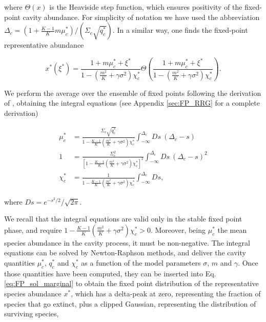 \documentclass[
    preprint,
    linenumbers,
    amsmath,amssymb,amsfonts,
    aps, physrev,
    superscriptaddress,
    10pt,
    bibnotes
    ]{revtex4-2}
\begin{document}
where $\Theta(x)$ is the Heaviside step function, which ensures positivity
of the fixed-point cavity abundance. For simplicity of notation we
have used the abbreviation $\Delta_{c}=(1+\frac{K-1}{K}m\mu_{c}^{*})/(\Sigma_{c}\sqrt{q_{c}^{*}})$. In a similar way, one finds the
fixed-point representative abundance

\begin{equation}
x^{*}\left(\xi^{*}\right)=\frac{1+m\mu_{c}^{*}+\xi^{*}}{1-\left(\frac{m^{2}}{K}+\gamma\sigma^{2}\right)\chi_{c}^{*}}\Theta\left(\frac{1+m\mu_{c}^{*}+\xi^{*}}{1-\left(\frac{m^{2}}{K}+\gamma\sigma^{2}\right)\chi_{c}^{*}}\right).\label{eq:FP_sol_marginal}
\end{equation}

We perform the average over the ensemble of fixed points following
the derivation of \cite{opperPhaseTransition11992,gallaRandomReplicatorsAsymmetric2006,gallaDynamicallyEvolvedCommunity2018},
obtaining the integral equations (see Appendix \ref{sec:FP_RRG} for
a complete derivation)

\begin{subequations}
\begin{align}
\mu_{c}^{*} & =\frac{\Sigma_{c}\sqrt{q_{c}^{*}}}{1-\frac{K-1}{K}\left(\frac{m^{2}}{K}+\gamma\sigma^{2}\right)\chi_{c}^{*}}\int_{-\infty}^{\Delta_{c}}Ds\:\left(\Delta_{c}-s\right)\label{eq:FP_eq_1}\\
1 & =\frac{\Sigma_{c}^{2}}{\left[1-\frac{K-1}{K}\left(\frac{m^{2}}{K}+\gamma\sigma^{2}\right)\chi_{c}^{*}\right]^{2}}\int_{-\infty}^{\Delta_{c}}Ds\:\left(\Delta_{c}-s\right)^{2}\label{eq:FP_eq_2}\\
\chi_{c}^{*} & =\frac{1}{1-\frac{K-1}{K}\left(\frac{m^{2}}{K}+\gamma\sigma^{2}\right)\chi_{c}^{*}}\int_{-\infty}^{\Delta_{c}}Ds,\label{eq:FP_eq_3}
\end{align}
\end{subequations}

where $Ds=e^{-s^{2}/2}/\sqrt{2\pi}$. 

We recall that the integral equations are valid only in the stable
fixed point phase, and require $1-\frac{K-1}{K}\left(\frac{m^{2}}{K}+\gamma\sigma^{2}\right)\chi_{c}^{*}>0$.
Moreover, being $\mu_{c}^{*}$ the mean species abundance in the cavity
process, it must be non-negative. The integral equations can be solved
by Newton-Raphson methods, and deliver the cavity quantities $\mu_{c}^{*}$,
$q_{c}^{*}$ and $\chi_{c}^{*}$ as a function of the model parameters
$\sigma$, $m$ and $\gamma$. Once those quantities have been computed,
they can be inserted into Eq. \eqref{eq:FP_sol_marginal} to obtain
the fixed point distribution of the representative species abundance
$x^{*}$, which has a delta-peak at zero, representing the fraction
of species that go extinct, plus a clipped Gaussian, representing
the distribution of surviving species,
\end{document}
